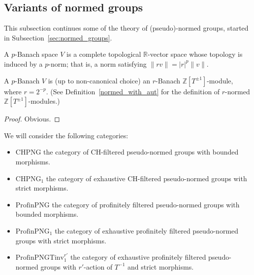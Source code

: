 \subsection{Variants of normed groups}
\label{sec:normed_groups2}

This subsection continues some of the theory of (pseudo)-normed groups,
started in Subsection~\ref{sec:normed_groups}.

\begin{definition}
  \label{p-banach}
  \leanok
  A $p$-Banach space $V$ is a complete topological $\mathbb R$-vector space
  whose topology is induced by a $p$-norm;
  that is, a norm satisfying $\|rv\| = |r|^p\|v\|$.
\end{definition}

\begin{lemma}
  \label{p-banach-r-normed}
  \leanok
   A $p$-Banach $V$ is (up to non-canonical choice) an $r$-Banach $\mathbb Z[T^{\pm 1}]$-module, where $r=2^{-p}$.
   (See Definition~\ref{normed_with_aut} for the definition of $r$-normed $\mathbb Z[T^{\pm 1}]$-modules.)
\end{lemma}

\begin{proof}
  \leanok
  Obvious.
\end{proof}

\begin{definition}
  \label{png-cats}
  \leanok
  We will consider the following categories:
  \begin{itemize}
    \item $\text{CHPNG}$ the category of CH-filtered pseudo-normed groups with bounded morphisms.
    \item $\text{CHPNG}_1$ the category of exhaustive CH-filtered pseudo-normed groups with strict morphisms.
    \item $\text{ProfinPNG}$ the category of profinitely filtered pseudo-normed groups with bounded morphisms.
    \item $\text{ProfinPNG}_1$ the category of exhaustive profinitely filtered pseudo-normed groups with strict morphisms.
    \item $\text{ProfinPNGTinv}_1^{r'}$ the category of exhaustive profinitely filtered pseudo-normed groups with $r'$-action of $T^{-1}$ and strict morphisms.
  \end{itemize}
\end{definition}

